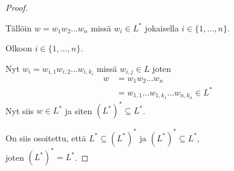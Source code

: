 \documentclass[a4paper,11pt,draft]{article}
\begin{document}
\begin{enumerate}
\begin{enumerate}
\begin{proof}
\begin{description}
        Tällöin $w = w_1w_2 \ldots w_n$ missä $w_i \in L^*$ jokaisella
        $i \in \{1, \ldots, n\}$.

        Olkoon $i \in \{1, \ldots, n\}$.

        Nyt $w_i = w_{i,1}w_{i,2} \ldots w_{i,k_i}$ missä $w_{i,j} \in
        L$ joten
        \begin{align*}
          w &= w_1w_2 \ldots w_n \\
          &= w_{1,1} \ldots w_{1,k_1} \ldots w_{n,k_n} \in L^*
        \end{align*}
        Nyt siis $w \in L^*$ ja siten $(L^*)^* \subseteq L^*$.
      \end{description}

      On siis osoitettu, että $L^* \subseteq (L^*)^*$ ja $(L^*)^*
      \subseteq L^*$, \\ joten $(L^*)^* = L^*$.
    \end{proof}


\end{enumerate}
\end{enumerate}
\end{document}
